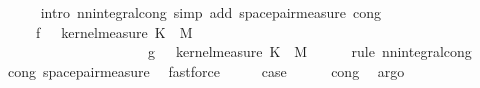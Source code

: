 \begin{isabellebody}
\ \ \ \ \isamarkupfalse%
\ {\isacharparenleft}{\kern0pt}intro\ nn{\isacharunderscore}{\kern0pt}integral{\isacharunderscore}{\kern0pt}cong{\isacharcomma}{\kern0pt}\ simp\ add{\isacharcolon}{\kern0pt}\ space{\isacharunderscore}{\kern0pt}pair{\isacharunderscore}{\kern0pt}measure\ cong{\isacharparenleft}{\kern0pt}{}{\isacharparenright}{\kern0pt}{\isacharparenright}{\kern0pt}\isanewline
\ \ \isamarkupfalse%
\ \isamarkupfalse%
\ {\isachardoublequoteopen}{\isacharparenleft}{\kern0pt}{\isasymintegral}\isactrlsup {\isacharplus}{\kern0pt}\ {\isasymomega}\ {\isasymintegral}\isactrlsup {\isacharplus}{\kern0pt}\ {\isasymomega}\ f\ {\isacharparenleft}{\kern0pt}{\isasymomega}\ {\isasymomega}\ {\isasympartial}kernel{\isacharunderscore}{\kern0pt}measure\ K\ {\isasymomega}\ {\isasympartial}M{\isacharparenright}{\kern0pt}\ {\isacharequal}{\kern0pt}\isanewline
\ \ \ \ \ \ \ \ \ \ \ \ \ \ \ \ \ {\isacharparenleft}{\kern0pt}{\isasymintegral}\isactrlsup {\isacharplus}{\kern0pt}\ {\isasymomega}\ {\isasymintegral}\isactrlsup {\isacharplus}{\kern0pt}\ {\isasymomega}\ g\ {\isacharparenleft}{\kern0pt}{\isasymomega}\ {\isasymomega}\ {\isasympartial}kernel{\isacharunderscore}{\kern0pt}measure\ K\ {\isasymomega}\ {\isasympartial}M{\isacharparenright}{\kern0pt}{\isachardoublequoteclose}\isanewline
\ \ \ \ \isamarkupfalse%
\ {\isacharparenleft}{\kern0pt}rule\ nn{\isacharunderscore}{\kern0pt}integral{\isacharunderscore}{\kern0pt}cong{\isacharparenright}{\kern0pt}{\isacharplus}{\kern0pt}\isanewline
\ \ \ \ \isamarkupfalse%
\ cong{\isacharparenleft}{\kern0pt}{}{\isacharparenright}{\kern0pt}\ space{\isacharunderscore}{\kern0pt}pair{\isacharunderscore}{\kern0pt}measure\ \isamarkupfalse%
\ fastforce\isanewline
\ \ \isamarkupfalse%
\ \isamarkupfalse%
\ {\isacharquery}{\kern0pt}case\isanewline
\ \ \ \ \isamarkupfalse%
\ cong{\isacharparenleft}{\kern0pt}{}{\isacharparenright}{\kern0pt}\ \isamarkupfalse%
\ argo\isanewline
{}\isamarkupfalse%

\end{isabellebody}
